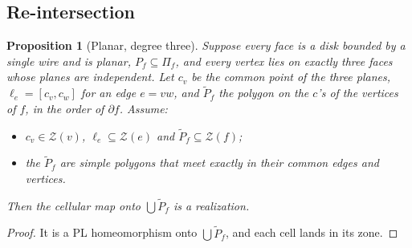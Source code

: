\documentclass[preprint,12pt]{elsarticle}
\newtheorem{proposition}[theorem]{Proposition}
\theoremstyle{definition}
\theoremstyle{remark}
\newcommand{\Z}{\mathcal{Z}}
\begin{document}
\subsection{Re-intersection}

\begin{proposition}[Planar, degree three]\label{prop:B}
Suppose every face is a disk bounded by a single wire and is planar, $P_f\subseteq\Pi_f$, and every vertex lies on exactly three faces whose planes are
independent. Let $c_v$ be the common point of the three planes, $\ell_e=[c_v,c_w]$ for an edge $e=vw$, and
$\tilde P_f$ the polygon on the $c$'s of the vertices of $f$, in the order of $\partial f$. Assume:
\begin{itemize}
\item $c_v\in\Z(v)$, $\ell_e\subseteq\Z(e)$ and $\tilde P_f\subseteq\Z(f)$;
\item the $\tilde P_f$ are simple polygons that meet exactly in their common edges and vertices.
\end{itemize}
Then the cellular map onto $\bigcup\tilde P_f$ is a realization.
\end{proposition}
\begin{proof}
It is a PL homeomorphism onto $\bigcup\tilde P_f$, and each cell lands in its zone.
\end{proof}
\end{document}
